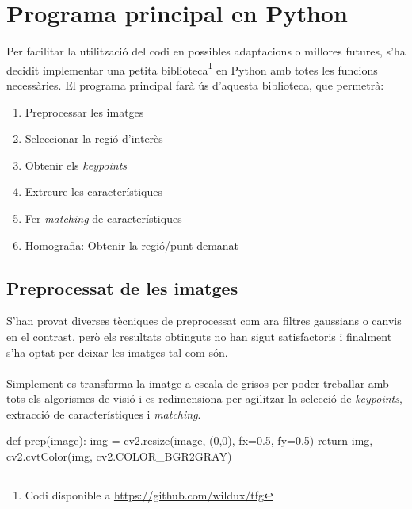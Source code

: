 \label{sec:Implementacio}

\section{Programa principal en Python}
	Per facilitar la utilització del codi en possibles adaptacions o millores futures, s'ha decidit implementar una petita biblioteca\footnote{Codi disponible a \url{https://github.com/wildux/tfg}}
	en Python amb totes les funcions necessàries. El programa principal farà ús d'aquesta biblioteca, que permetrà:

	\begin{enumerate}
		\item{Preprocessar les imatges}
		\item{Seleccionar la regió d'interès}
		\item{Obtenir els \textit{keypoints}}
		\item{Extreure les característiques}
		\item{Fer \textit{matching} de característiques}
		\item{Homografia: Obtenir la regió/punt demanat}
	\end{enumerate}

	\subsection{Preprocessat de les imatges}
		S'han provat diverses tècniques de preprocessat com ara filtres gaussians o canvis en el contrast, però els resultats obtinguts no han sigut satisfactoris i finalment s'ha optat per deixar
		les imatges tal com són.\\\\
		Simplement es transforma la imatge a escala de grisos per poder treballar amb tots els algorismes de visió i es redimensiona per agilitzar la selecció de \textit{keypoints}, extracció
		de característiques i \textit{matching}.\\
		\begin{python}
def prep(image):
	img = cv2.resize(image, (0,0), fx=0.5, fy=0.5)
	return img, cv2.cvtColor(img, cv2.COLOR_BGR2GRAY)
		\end{python}

